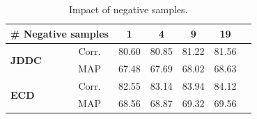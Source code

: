 \documentclass[11pt]{article}
\begin{document}
\begin{table}[tb]
    \centering
    \small
    \begin{tabular}{lc|ccccc}
        \toprule
        \multicolumn{2}{c|}{\textbf{\# Negative samples}} & \textbf{1} & \textbf{4} & \textbf{9}  & \textbf{19} \\
        \midrule
        \multirow{2}{*}{\textbf{JDDC}} & Corr. & 80.60  &  80.85  &  81.22  &  81.56  \\
                                       & MAP   & 67.48  &  67.69  &  68.02  &  68.63     \\
        \midrule
        \multirow{2}{*}{\textbf{ECD}} & Corr.   & 82.55   &   83.14   &   83.94 & 84.12     \\
                                       & MAP   & 68.56   &   68.87   &   69.32 & 69.56    \\
        \bottomrule
    \end{tabular}
    \caption{Impact of negative samples.}
    \label{tab:negative samples}
\end{table}








\end{document}
